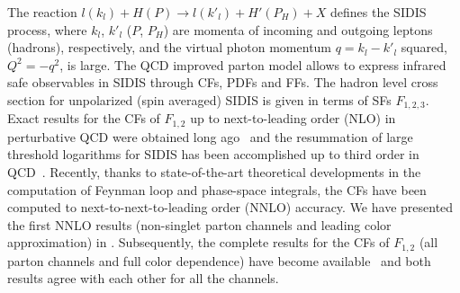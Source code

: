 \documentclass[%
 twocolumn,
 superscriptaddress,
 preprintnumbers,
 nofootinbib,
 amsmath,amssymb,
 aps,
 prl,
]{revtex4}
\begin{document}
The reaction $l(k_l) + H(P) \rightarrow  l({k}'_l) + H'(P_H) + X$ defines the SIDIS process, 
where $k_l$, ${k}'_l$ ($P$, $P_H$) are momenta of incoming and outgoing leptons (hadrons), respectively, and 
the virtual photon momentum $q= k_l - {k}'_l$ squared, $Q^2=-q^2$, is large. 
The QCD improved parton model allows to express infrared safe observables in SIDIS through CFs, PDFs and FFs.
The hadron level cross section for unpolarized (spin averaged) SIDIS is given in terms of 
SFs $F_{1,2,3}$.
Exact results for the CFs of $F_{1,2}$ up to next-to-leading order (NLO) in perturbative QCD were obtained long ago~\cite{Altarelli:1979kv,Furmanski:1981cw} and the resummation of large threshold logarithms for SIDIS 
has been accomplished up to third order in QCD~\cite{Cacciari:2001cw,Anderle:2012rq,Anderle:2013lka,Abele:2021nyo,Abele:2022wuy}.
Recently, thanks to state-of-the-art theoretical developments in the computation of Feynman loop and phase-space integrals, the CFs have been computed to next-to-next-to-leading order (NNLO) accuracy. 
We have presented the first NNLO results (non-singlet parton channels and leading color approximation) in \cite{Goyal:2023xfi}. Subsequently, the complete results for the CFs of $F_{1,2}$ (all parton channels and full color dependence) 
have become available~\cite{Bonino:2024qbh,Goyal:2024xxx} and both results agree with each other for all the channels.
\end{document}
